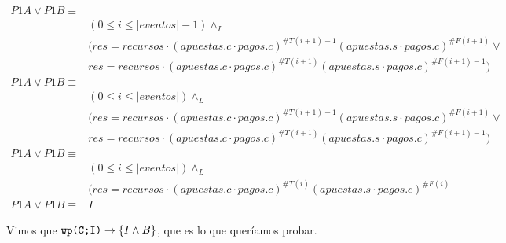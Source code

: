 \documentclass[document.tex]{subfiles}
\begin{document}
\begin{equation}
\begin{split}
P1A \lor P1B \equiv \\
    &(0\leq i \leq |eventos|-1 )\land_L\\
    &(res = recursos \cdot (apuestas.c\cdot pagos.c)^{\#T(i+1)-1}(apuestas.s\cdot pagos.c)^{\#F(i+1)} \lor \\
    & res = recursos \cdot (apuestas.c\cdot pagos.c)^{\#T(i+1)}(apuestas.s\cdot pagos.c)^{\#F(i+1)-1})\\
P1A \lor P1B \equiv \\
    &(0\leq i \leq |eventos|)\land_L\\
    &(res = recursos \cdot (apuestas.c\cdot pagos.c)^{\#T(i+1)-1}(apuestas.s\cdot pagos.c)^{\#F(i+1)} \lor \\
    & res = recursos \cdot (apuestas.c\cdot pagos.c)^{\#T(i+1)}(apuestas.s\cdot pagos.c)^{\#F(i+1)-1})\\
P1A \lor P1B \equiv \\
    &(0\leq i \leq |eventos|)\land_L\\
    &(res = recursos \cdot (apuestas.c\cdot pagos.c)^{\#T(i)}(apuestas.s\cdot pagos.c)^{\#F(i)}\\
P1A \lor P1B \equiv & I
\end{split}
\end{equation}

Vimos que $\verb+wp(C;I)+ \to \{I \land B\}$, que es lo que queríamos probar.
\end{document}
